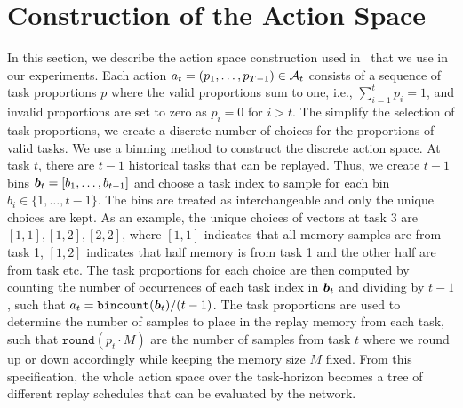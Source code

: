 
\section{Construction of the Action Space}\label{paperD:app:construction_of_the_action_space}

In this section, we describe the action space construction used in~ that we use in our experiments. Each action $a_t = (p_1, \dots, p_{T-1}) \in {\mathcal{A}}_t$ consists of a sequence of task proportions $p$ where the valid proportions sum to one, i.e., $\sum_{i=1}^{t} p_i = 1$, and invalid proportions are set to zero as $p_i = 0$ for $i>t$. The simplify the selection of task proportions, we create a discrete number of choices for the proportions of valid tasks. We use a binning method to construct the discrete action space. At task $t$, there are $t-1$ historical tasks that can be replayed. Thus, we create $t-1$ bins ${\bm{b}}_t = [b_1, \dots, b_{t-1}]$ and choose a task index to sample for each bin $b_i \in \{1, \dots, t-1 \}$. The bins are treated as interchangeable and only the unique choices are kept. As an example, the unique choices of vectors at task 3 are $[1,1], [1,2], [2,2]$, where $[1,1]$ indicates that all memory samples are from task 1, $[1,2]$ indicates that half memory is from task 1 and the other half are from task etc. The task proportions for each choice are then computed by counting the number of occurrences of each task index in ${\bm{b}}_t$ and dividing by $t-1$, such that $a_t = \texttt{bincount}({\bm{b}}_t) / (t-1)$. The task proportions are used to determine the number of samples to place in the replay memory from each task, such that $\texttt{round}(p_t \cdot M)$ are the number of samples from task $t$ where we round up or down accordingly while keeping the memory size $M$ fixed. From this specification, the whole action space over the task-horizon becomes a tree of different replay schedules that can be evaluated by the network.
